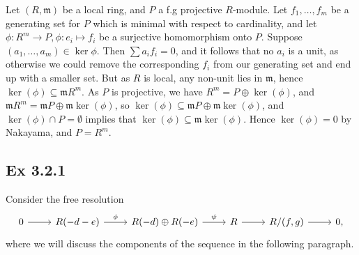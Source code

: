 \documentclass{article}
\theoremstyle{definition}
\begin{document}
Let $(R, \mathfrak{m})$ be a local ring, and $P$ a f.g projective $R$-module.
Let $f_1, \ldots, f_m$ be a generating set for $P$ which is minimal with
respect to cardinality, and let $\phi : R^{m} \to P, \phi : e_i \mapsto f_i$ be
a surjective homomorphism onto $P$. Suppose $(a_1, \ldots, a_m) \in \ker \phi$.
Then $\sum a_i f_i = 0$, and it follows that no $a_i$ is a unit, as otherwise
we could remove the corresponding $f_i$ from our generating set and end up with
a smaller set. But as $R$ is local, any non-unit lies in $\mathfrak{m}$, hence
$\ker(\phi) \subseteq \mathfrak{m}R^m$. As $P$ is projective, we have $R^m = P
\oplus \ker(\phi)$, and $\mathfrak{m}R^m = \mathfrak{m}P \oplus
\mathfrak{m}\ker(\phi)$, so $\ker(\phi) \subseteq \mathfrak{m}P \oplus
\mathfrak{m}\ker(\phi)$, and $\ker(\phi) \cap P = \emptyset$ implies that
$\ker(\phi) \subseteq \mathfrak{m}\ker(\phi)$. Hence $\ker(\phi) = 0$ by
Nakayama, and $P = R^m$.

\subsection*{Ex 3.2.1}

Consider the free resolution 
\[
\begin{tikzcd}
  0 
  \arrow[r] & 
  R(-d - e)
  \arrow[r, "\phi"] & 
  R(-d) \oplus R(-e)
  \arrow[r, "\psi"] & 
  R
  \arrow[r] & 
  R/(f, g)
  \ar[r] & 
  0,
\end{tikzcd}
\] 
where we will discuss the components of the sequence in the following
paragraph. \\
\end{document}
